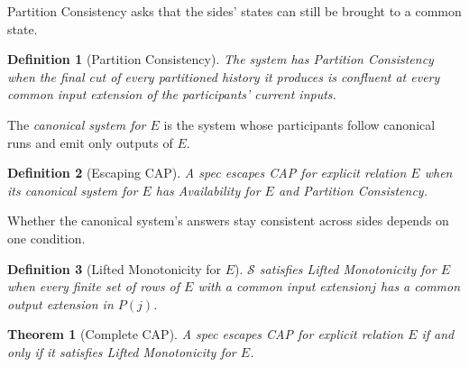 \documentclass[sigconf]{cidr-2027}
\newtheorem{theorem}{Theorem}
\newtheorem{definition}{Definition}
\theoremstyle{remark}
\newcommand{\indesc}{input extension\xspace} %
\newcommand{\outnoun}{output extension\xspace}%
\newcommand{\Spec}{\mathcal{S}}
\newcommand{\fiber}[1]{P(#1)}
\begin{document}
\textcolor{newblue}{Partition Consistency asks that the sides' states can still be brought to a
common state.}

\begin{definition}[Partition Consistency]
\label{def:partition-consistency}
The system has \emph{Partition Consistency} when the final cut of every
partitioned history it produces is confluent at every common \indesc of the
participants' current inputs.
\end{definition}

The \emph{canonical system for $E$} is the system whose participants follow
canonical runs and emit only outputs of $E$.

\begin{definition}[Escaping CAP]
\label{def:escapes-cap}
\textcolor{newblue}{A spec \emph{escapes CAP} for explicit relation $E$ when its canonical system for $E$ has
Availability for $E$ and Partition Consistency.}
\end{definition}

Whether the canonical system's answers stay consistent across sides depends on
one condition.

\begin{definition}[Lifted Monotonicity for $E$]
\label{def:lm-for-A}
$\Spec$ satisfies \emph{Lifted Monotonicity for $E$} when every finite set of
rows of $E$ with a common \indesc $j$ has a common \outnoun in $\fiber{j}$.
\end{definition}

\begin{theorem}[Complete CAP]
\label{thm:complete-cap}
\textcolor{newblue}{A spec escapes CAP for explicit relation $E$ if and only if it satisfies Lifted Monotonicity for
$E$.}
\end{theorem}
\end{document}
